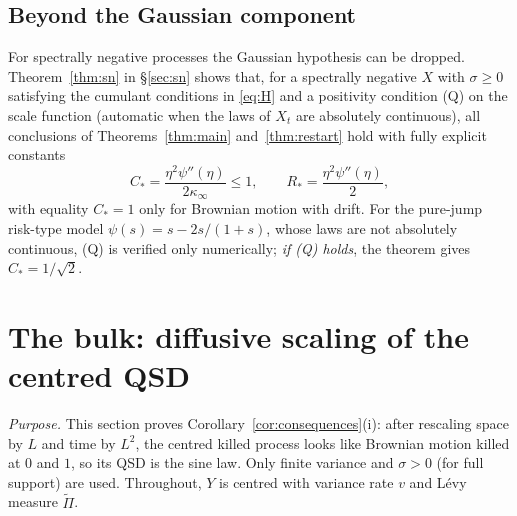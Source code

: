 \documentclass[11pt,a4paper]{article}
\theoremstyle{definition}
\theoremstyle{remark}
\newcommand{\1}{\mathbf 1}
\newcommand{\kinf}{\kappa_\infty}
\begin{document}
\subsection{Beyond the Gaussian component}
For spectrally negative processes the Gaussian hypothesis can be dropped. Theorem~\ref{thm:sn} in \S\ref{sec:sn} shows that, for a spectrally negative $X$ with $\sigma\ge0$ satisfying the cumulant conditions in \eqref{eq:H} and a positivity condition (Q) on the scale function (automatic when the laws of $X_t$ are absolutely continuous), all conclusions of Theorems~\ref{thm:main} and~\ref{thm:restart} hold with fully explicit constants
\[
 C_*=\frac{\eta^2\psi''(\eta)}{2\kinf}\le1,\qquad R_*=\frac{\eta^2\psi''(\eta)}{2},
\]
with equality $C_*=1$ only for Brownian motion with drift. For the pure-jump risk-type model $\psi(s)=s-2s/(1+s)$, whose laws are not absolutely continuous, (Q) is verified only numerically; \emph{if (Q) holds}, the theorem gives $C_*=1/\sqrt2$.


\section{The bulk: diffusive scaling of the centred QSD}\label{sec:diffusive}
\emph{Purpose.} This section proves Corollary~\ref{cor:consequences}(i): after rescaling space by $L$ and time by $L^2$, the centred killed process looks like Brownian motion killed at $0$ and $1$, so its QSD is the sine law. Only finite variance and $\sigma>0$ (for full support) are used. Throughout, $Y$ is centred with variance rate $v$ and L\'evy measure $\widetilde\Pi$.
\end{document}
